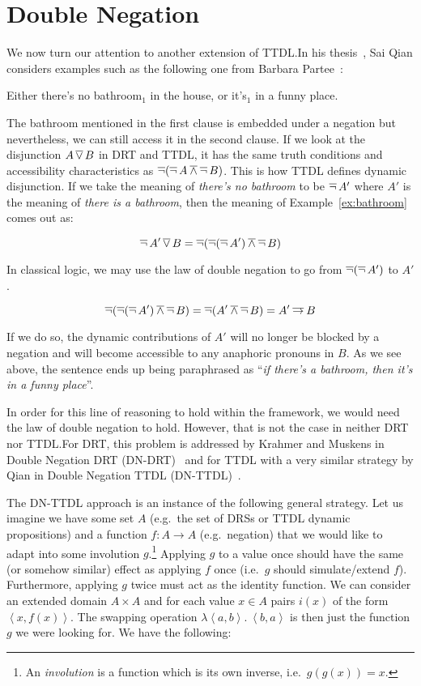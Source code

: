 \section{Double Negation}
\label{sec:double-negation}

We now turn our attention to another extension of TTDL.\@ In his
thesis~\cite{qian2014accessibility}, Sai Qian considers examples such as
the following one from Barbara Partee~\cite{roberts1989modal}:

\begin{exe}
  \ex \label{ex:bathroom} Either there's no bathroom$_1$ in the house, or
  it's$_1$ in a funny place.
\end{exe}

The bathroom mentioned in the first clause is embedded under a negation but
nevertheless, we can still access it in the second clause. If we look at
the disjunction $A \mathop{\overline{\lor}} B$ in DRT and TTDL, it has the same truth
conditions and accessibility characteristics as
$\mathop{\overline{\lnot}} (\mathop{\overline{\lnot}} A \mathbin{\overline{\land}} \mathop{\overline{\lnot}} B)$. This is how TTDL defines dynamic
disjunction. If we take the meaning of \emph{there's no bathroom} to be
$\mathop{\overline{\lnot}} A'$ where $A'$ is the meaning of \emph{there is a bathroom}, then
the meaning of Example~\ref{ex:bathroom} comes out as:

$$
\mathop{\overline{\lnot}} A' \mathop{\overline{\lor}} B = \mathop{\overline{\lnot}} (\mathop{\overline{\lnot}} (\mathop{\overline{\lnot}} A') \mathbin{\overline{\land}} \mathop{\overline{\lnot}} B)
$$

In classical logic, we may use the law of double negation to go from
$\mathop{\overline{\lnot}} (\mathop{\overline{\lnot}} A')$ to $A'$.

$$
\mathop{\overline{\lnot}} (\mathop{\overline{\lnot}} (\mathop{\overline{\lnot}} A') \mathbin{\overline{\land}} \mathop{\overline{\lnot}} B) = \mathop{\overline{\lnot}} (A' \mathbin{\overline{\land}} \mathop{\overline{\lnot}} B) = A' \mathbin{\overline{\to}} B
$$

If we do so, the dynamic contributions of $A'$ will no longer be blocked by
a negation and will become accessible to any anaphoric pronouns in $B$. As
we see above, the sentence ends up being paraphrased as ``\emph{if there's
  a bathroom, then it's in a funny place}''.

In order for this line of reasoning to hold within the framework, we would
need the law of double negation to hold. However, that is not the case in
neither DRT nor TTDL.\@ For DRT, this problem is addressed by Krahmer and
Muskens in Double Negation DRT (DN-DRT)~\cite{krahmer1995negation} and for
TTDL with a very similar strategy by Qian in Double Negation TTDL
(DN-TTDL)~\cite{qian2014accessibility}.

The DN-TTDL approach is an instance of the following general strategy. Let
us imagine we have some set $A$ (e.g.\ the set of DRSs or TTDL dynamic
propositions) and a function $f : A \to A$ (e.g.\ negation) that we would
like to adapt into some involution $g$.\footnote{An \emph{involution} is a
  function which is its own inverse, i.e.\ $g(g(x)) = x$.} Applying $g$ to
a value once should have the same (or somehow similar) effect as applying
$f$ once (i.e.\ $g$ should simulate/extend $f$). Furthermore, applying $g$
twice must act as the identity function. We can consider an extended domain
$A \times A$ and for each value $x \in A$ pairs $i(x)$ of the form
$\left<x, f(x)\right>$. The swapping operation
$\lambda \left<a, b\right>.\ \left<b, a\right>$ is then just the function
$g$ we were looking for. We have the following:

